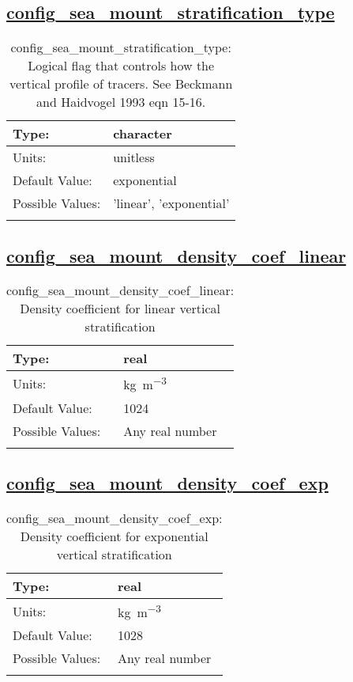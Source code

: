 \subsection[config\_sea\_mount\_stratification\_type]{\hyperref[sec:nm_tab_sea_mount]{config\_sea\_mount\_stratification\_type}}
\label{subsec:nm_sec_config_sea_mount_stratification_type}
\begin{center}
\begin{longtable}{| p{2.0in} || p{4.0in} |}
    \hline
    Type: & character \\
    \hline
    Units: & \si{unitless} \\
    \hline
    Default Value: & exponential \\
    \hline
    Possible Values: & 'linear', 'exponential' \\
    \hline
    \caption{config\_sea\_mount\_stratification\_type: Logical flag that controls how the vertical profile of tracers.  See Beckmann and Haidvogel 1993 eqn 15-16.}
\end{longtable}
\end{center}
\subsection[config\_sea\_mount\_density\_coef\_linear]{\hyperref[sec:nm_tab_sea_mount]{config\_sea\_mount\_density\_coef\_linear}}
\label{subsec:nm_sec_config_sea_mount_density_coef_linear}
\begin{center}
\begin{longtable}{| p{2.0in} || p{4.0in} |}
    \hline
    Type: & real \\
    \hline
    Units: & \si{kg.m^{-3}} \\
    \hline
    Default Value: & 1024 \\
    \hline
    Possible Values: & Any real number \\
    \hline
    \caption{config\_sea\_mount\_density\_coef\_linear: Density coefficient for linear vertical stratification}
\end{longtable}
\end{center}
\subsection[config\_sea\_mount\_density\_coef\_exp]{\hyperref[sec:nm_tab_sea_mount]{config\_sea\_mount\_density\_coef\_exp}}
\label{subsec:nm_sec_config_sea_mount_density_coef_exp}
\begin{center}
\begin{longtable}{| p{2.0in} || p{4.0in} |}
    \hline
    Type: & real \\
    \hline
    Units: & \si{kg.m^{-3}} \\
    \hline
    Default Value: & 1028 \\
    \hline
    Possible Values: & Any real number \\
    \hline
    \caption{config\_sea\_mount\_density\_coef\_exp: Density coefficient for exponential vertical stratification}
\end{longtable}
\end{center}
